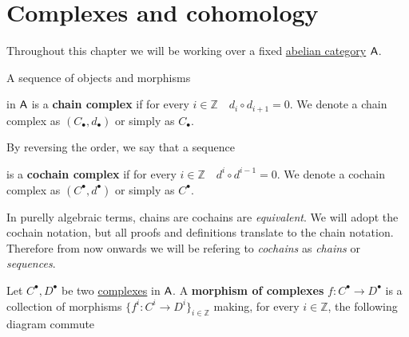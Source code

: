 \documentclass[../../../main]{subfiles}
\begin{document}
\section{Complexes and cohomology}

Throughout this chapter we will be working over a fixed \hyperref[def:abelian-category]{abelian category} \(\mathsf{A}\).

\begin{definition}[Complex] \label{def:complex}
  A sequence of objects and morphisms
  \begin{center}
  \end{center}
  in \(\mathsf{A}\) is a \textbf{chain complex} if for every \(i \in \mathbb{Z} \quad d_{i} \circ d_{i+1} = 0\).
  We denote a chain complex as \((C_{\bullet}, d_{\bullet})\) or simply as \(C_{\bullet}\).

  By reversing the order, we say that a sequence
  \begin{center}
  \end{center}
  is a \textbf{cochain complex} if for every \(i \in \mathbb{Z} \quad d^{i} \circ d^{i-1} = 0\).
  We denote a cochain complex as \((C^{\bullet}, d^{\bullet})\) or simply as \(C^{\bullet}\).
\end{definition}

\begin{remark}
  In purelly algebraic terms, chains are cochains are \textit{equivalent}.
  We will adopt the cochain notation, but all proofs and definitions translate to the chain notation.
  Therefore from now onwards we will be refering to \textit{cochains} as \textit{chains} or \textit{sequences}.
\end{remark}

\begin{definition} \label{def:complex-morphism}
  Let \(C^{\bullet}, D^{\bullet}\) be two \hyperref[def:complex]{complexes} in \(\mathsf{A}\).
  A \textbf{morphism of complexes} \(f: C^{\bullet} \to D^{\bullet}\) is a collection of morphisms \(\{f^{i}: C^{i} \to D^{i}\}_{i \in \mathbb{Z}}\) making, for every \(i \in \mathbb{Z}\), the following diagram commute
  \begin{center}
  \end{center}
\end{definition}
\end{document}
